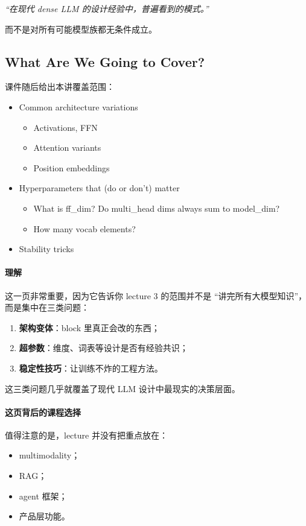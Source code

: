\documentclass[a4paper,UTF8]{article}
\numberwithin{equation}{section}
\begin{document}
\begin{center}
\emph{“在现代 dense LLM 的设计经验中，普遍看到的模式。”}
\end{center}

而不是对所有可能模型族都无条件成立。

\subsection{What Are We Going to Cover?}

课件随后给出本讲覆盖范围：
\begin{itemize}
    \item Common architecture variations
    \begin{itemize}
        \item Activations, FFN
        \item Attention variants
        \item Position embeddings
    \end{itemize}
    \item Hyperparameters that (do or don’t) matter
    \begin{itemize}
        \item What is ff\_dim? Do multi\_head dims always sum to model\_dim?
        \item How many vocab elements?
    \end{itemize}
    \item Stability tricks
\end{itemize}

\paragraph{理解}
这一页非常重要，因为它告诉你 lecture 3 的范围并不是 ``讲完所有大模型知识''，而是集中在三类问题：

\begin{enumerate}
    \item \textbf{架构变体}：block 里真正会改的东西；
    \item \textbf{超参数}：维度、词表等设计是否有经验共识；
    \item \textbf{稳定性技巧}：让训练不炸的工程方法。
\end{enumerate}

这三类问题几乎就覆盖了现代 LLM 设计中最现实的决策层面。

\paragraph{这页背后的课程选择}
值得注意的是，lecture 并没有把重点放在：
\begin{itemize}
    \item multimodality；
    \item RAG；
    \item agent 框架；
    \item 产品层功能。
\end{itemize}
\end{document}

